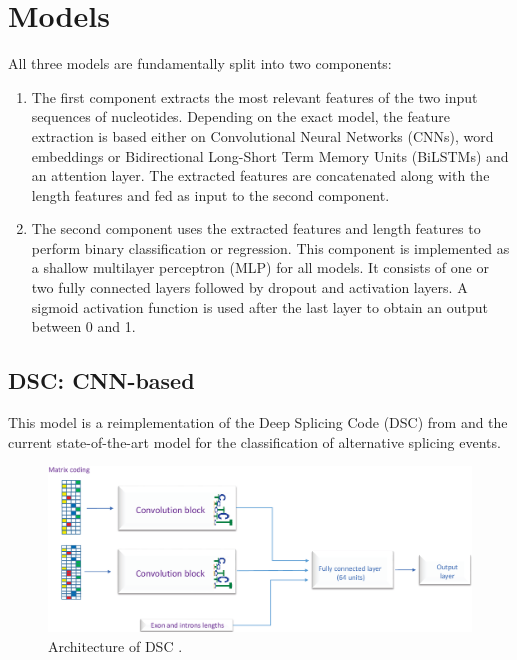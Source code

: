 \section{Models} \label{sec:models}
All three models are fundamentally split into two components: 
\begin{enumerate}
	\item The first component extracts the most relevant features of the two input sequences of nucleotides.  Depending on the exact model, the feature extraction is based either on Convolutional Neural Networks (CNNs), word embeddings or Bidirectional Long-Short Term Memory Units (BiLSTMs) and an attention layer. The extracted features are concatenated along with the length features and fed as input to the second component. 
	
	\item The second component uses the extracted features and length features to perform binary classification or regression. This component is implemented as a shallow multilayer perceptron (MLP) for all models. It consists of one or two fully connected layers followed by dropout and activation layers. A sigmoid activation function is used after the last layer to obtain an output between 0 and 1.
\end{enumerate}

\subsection{DSC: CNN-based} \label{subsec:dsc}
This model is a reimplementation of the Deep Splicing Code (DSC) from \cite{dsc} and the current state-of-the-art model for the classification of alternative splicing events. 

\begin{figure}
	\centering\includegraphics[width=1\textwidth]{../visualizations/ch4-methods/dsc_architecture.png} 
	\caption{
		Architecture of DSC \cite{dsc}. 
	}
	\label{fig:dsc_architecture}
\end{figure}

